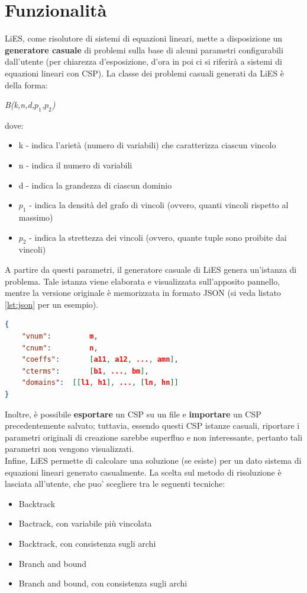 \documentclass[10pt, a4paper]{article}
\begin{document}
\section{Funzionalità}
\label{sec:funzionalita}

LiES, come risolutore di sistemi di equazioni lineari, mette a disposizione un \textbf{generatore casuale} di problemi sulla base di alcuni parametri configurabili dall'utente (per chiarezza d'esposizione, d'ora in poi ci si riferirà a sistemi di equazioni lineari con CSP). La classe dei problemi casuali generati da LiES è della forma:
\begin{center}
	\textit{B(k,n,d,$p_1$,$p_2$)}
\end{center}

dove:
\begin{itemize}
	\item k - indica l'arietà (numero di variabili) che caratterizza ciascun vincolo
	\item n - indica il numero di variabili
	\item d - indica la grandezza di ciascun dominio
	\item $p_1$ - indica la densità del grafo di vincoli (ovvero, quanti vincoli rispetto al massimo)
	\item $p_2$ - indica la strettezza dei vincoli (ovvero,	quante tuple sono proibite dai vincoli) 
\end{itemize}

A partire da questi parametri, il generatore casuale di LiES genera un'istanza di problema. Tale istanza viene elaborata e visualizzata sull'apposito pannello, mentre la versione originale è memorizzata in formato JSON (si veda listato \ref{lst:json} per un esempio).

\begin{lstlisting}[language=json, caption=Rappresentazione in formato json di un sistema di equazioni lineari, label=lst:json]
{
	"vnum": 		m,
	"cnum":			n,
	"coeffs":		[a11, a12, ..., amn],
	"cterms":		[b1, ..., bm],
	"domains":	[[l1, h1], ..., [ln, hn]]
}
\end{lstlisting}


Inoltre, è possibile \textbf{esportare} un CSP su un file e \textbf{importare} un CSP precedentemente salvato; tuttavia, essendo questi CSP istanze casuali, riportare i parametri originali di creazione sarebbe superfluo e non interessante, pertanto tali parametri non vengono visualizzati.\\

Infine, LiES permette di calcolare una soluzione (se esiste) per un dato sistema di equazioni lineari generato casualmente. La scelta sul metodo di risoluzione è lasciata all'utente, che puo' scegliere tra le seguenti tecniche:
\begin{itemize}
	\item Backtrack
	\item Bactrack, con variabile più vincolata
	\item Backtrack, con consistenza sugli archi
	\item Branch and bound
	\item Branch and bound, con consistenza sugli archi
\end{itemize}
\end{document}
